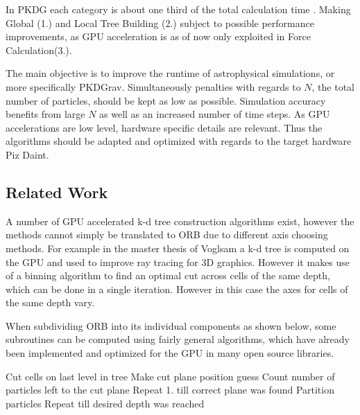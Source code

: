 \documentclass[]{article}
\begin{document}
In PKDG each category is about one third of the total calculation time \cite{Stadel2001}. Making Global (1.) and Local Tree Building (2.) subject to possible performance improvements, as GPU acceleration is as of now only exploited in Force Calculation(3.).

The main objective is to improve the runtime of astrophysical simulations, or more specifically PKDGrav. Simultaneously penalties with regards to $N$, the total number of particles, should be kept as low as possible. Simulation accuracy benefits from large $N$ as well as an increased number of time steps. As GPU accelerations are low level, hardware specific details are relevant. Thus the algorithms should be adapted and optimized with regards to the target hardware Piz Daint.

\subsection{Related Work}


A number of GPU accelerated k-d tree construction algorithms exist, however the methods cannot simply be translated to ORB due to different axis choosing methods. For example in the master thesis of Voglsam \cite{rrt} a k-d tree is computed on the GPU and used to improve ray tracing for 3D graphics. However it makes use of a binning algorithm to find an optimal cut across cells of the same depth, which can be done in a single iteration. However in this case the axes for cells of the same depth vary.

When subdividing ORB into its individual components as shown below, some subroutines can be computed using fairly general algorithms, which have already been implemented and optimized for the GPU in many open source libraries. 

\begin{outline}[enumerate]
	\1 Cut cells on last level in tree
	\2 Make cut plane position guess
	\2 Count number of particles left to the cut plane
	\2 Repeat 1. till correct plane was found
	\1 Partition particles
	\1 Repeat till desired depth was reached
\end{outline}
\end{document}
